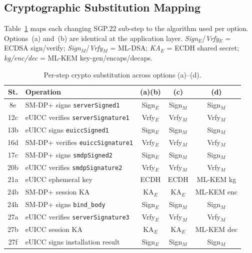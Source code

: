 \documentclass[final,3p,times,twocolumn]{elsarticle}
\begin{document}
\subsection{Cryptographic Substitution Mapping}\label{sec:sys-mapping}

Table~\ref{tab:substitution} maps each changing SGP.22 sub-step to the
algorithm used per option.  Options~(a) and~(b) are identical at the
application layer.
\emph{Sign}$_E$/\emph{Vrfy}$_E$ = ECDSA sign/verify;
\emph{Sign}$_M$/\emph{Vrfy}$_M$ = ML-DSA;
\emph{KA}$_E$ = ECDH shared secret;
\emph{kg/enc/dec} = ML-KEM key-gen/encaps/decaps.

\begin{table}[!htb]
\caption{Per-step crypto substitution across options (a)--(d).}
\label{tab:substitution}
\centering
\footnotesize
\setlength{\tabcolsep}{2pt}
\renewcommand{\arraystretch}{1.05}
\begin{tabularx}{\columnwidth}{@{}c >{\raggedright\arraybackslash}X ccc@{}}
\toprule
\textbf{St.} & \textbf{Operation} & \textbf{(a)(b)} & \textbf{(c)} & \textbf{(d)} \\
\midrule
8e  & SM-DP+ signs \texttt{serverSigned1}       & Sign$_E$ & Sign$_M$ & Sign$_M$ \\
12c & eUICC verifies \texttt{serverSignature1}   & Vrfy$_E$ & Vrfy$_M$ & Vrfy$_M$ \\
13b & eUICC signs \texttt{euiccSigned1}          & Sign$_E$ & Sign$_M$ & Sign$_M$ \\
16d & SM-DP+ verifies \texttt{euiccSignature1}   & Vrfy$_E$ & Vrfy$_M$ & Vrfy$_M$ \\
17c & SM-DP+ signs \texttt{smdpSigned2}          & Sign$_E$ & Sign$_M$ & Sign$_M$ \\
20b & eUICC verifies \texttt{smdpSignature2}     & Vrfy$_E$ & Vrfy$_M$ & Vrfy$_M$ \\
21a & eUICC ephemeral key                        & ECDH & ECDH & ML-KEM kg \\
24b & SM-DP+ session KA                          & KA$_E$   & KA$_E$   & ML-KEM enc \\
24h & SM-DP+ signs \texttt{bind\_body}           & Sign$_E$ & Sign$_M$ & Sign$_M$ \\
27a & eUICC verifies \texttt{serverSignature3}   & Vrfy$_E$ & Vrfy$_M$ & Vrfy$_M$ \\
27b & eUICC session KA                           & KA$_E$   & KA$_E$   & ML-KEM dec \\
27f & eUICC signs installation result            & Sign$_E$ & Sign$_M$ & Sign$_M$ \\
\bottomrule
\end{tabularx}
\end{table}
\end{document}
